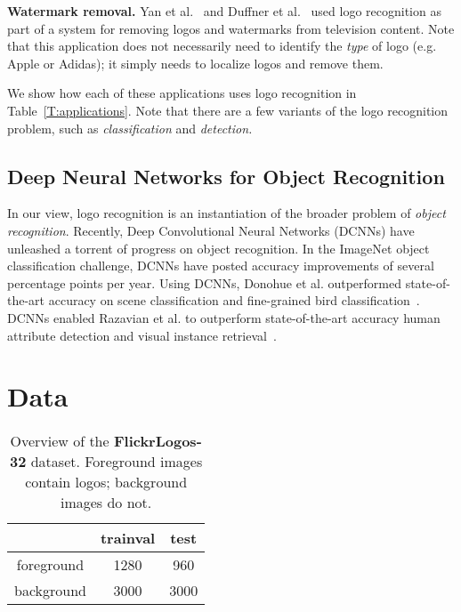 \documentclass{bmvc2k}
\begin{document}
{\bf Watermark removal.} Yan et al.~\cite{Yan2005} and Duffner et al.~\cite{duffner2006} used logo recognition as part of a system for removing logos and watermarks from television content. 
Note that this application does not necessarily need to identify the {\em type} of logo (e.g. Apple or Adidas); it simply needs to localize logos and remove them. 

We show how each of these applications uses logo recognition in Table~\ref{T:applications}. 
Note that there are a few variants of the logo recognition problem, such as {\em classification} and {\em detection.} 


\subsection{Deep Neural Networks for Object Recognition}
\vspace{-0.1in}

In our view, logo recognition is an instantiation of the broader problem of {\em object recognition}. 
Recently, Deep Convolutional Neural Networks (DCNNs) have unleashed a torrent of progress on object recognition.
In the ImageNet object classification challenge, DCNNs have posted accuracy improvements of several percentage points per year.
Using DCNNs, Donohue et al. outperformed state-of-the-art accuracy on scene classification and fine-grained bird classification~\cite{decaf}.
DCNNs enabled Razavian et al. to outperform state-of-the-art accuracy human attribute detection and visual instance retrieval~\cite{Razavian2014}.

\vspace{-0.1in}
\section{Data}
\vspace{-0.1in}
\label{sec:data}

\begin{table}[htb]
	
	\caption{Overview of the {\bf FlickrLogos-32} dataset. Foreground images contain logos; background images do not.}
	\label{T:data_overview}
	\centering
	\begin{tabular}{|c|c|c|}
		\hline
		& trainval & test \\ \hline
		foreground & 1280 & 960 \\ \hline
		background & 3000 & 3000 \\ \hline
	\end{tabular}
\end{table}
\end{document}
